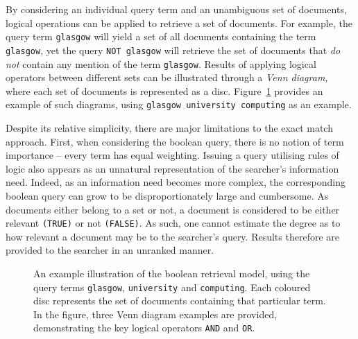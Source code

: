 By considering an individual query term and an unambiguous set of documents, logical operations can be applied to retrieve a set of documents. For example, the query term \texttt{glasgow} will yield a set of all documents containing the term \texttt{glasgow}, yet the query \texttt{NOT glasgow} will retrieve the set of documents that \emph{do not} contain any mention of the term \texttt{glasgow}. Results of applying logical operators between different sets can be illustrated through a \emph{Venn diagram,} where each set of documents is represented as a disc. Figure~\ref{fig:boolean} provides an example of such diagrams, using \texttt{glasgow university computing} as an example.

Despite its relative simplicity, there are major limitations to the exact match approach. First, when considering the boolean query, there is no notion of term importance -- every term has equal weighting. Issuing a query utilising rules of logic also appears as an unnatural representation of the searcher's information need. Indeed, as an information need becomes more complex, the corresponding boolean query can grow to be disproportionately large and cumbersome. As documents either belong to a set or not, a document is considered to be either relevant \texttt{(TRUE)} or not \texttt{(FALSE)}. As such, one cannot estimate the degree as to how relevant a document may be to the searcher's query. Results therefore are provided to the searcher in an unranked manner.

\begin{figure}[t!]
    \centering
    \caption[Venn diagrams illustrating boolean retrieval]{An example illustration of the boolean retrieval model, using the query terms \texttt{glasgow}, \texttt{university} and \texttt{computing}. Each coloured disc represents the set of documents containing that particular term. In the figure, three Venn diagram examples are provided, demonstrating the key logical operators \texttt{AND} and \texttt{OR}.}
    \label{fig:boolean}
\end{figure}

